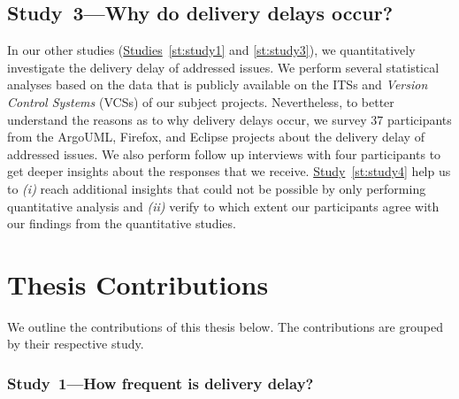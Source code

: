\subsection{Study~3---Why do delivery delays occur?}

 In our other studies
(\hyperref[st:study1]{Studies}~\ref{st:study1} and \ref{st:study3}), we
quantitatively investigate the delivery delay of addressed issues. We perform
several statistical analyses based on the data that is publicly available on the
ITSs and {\em Version Control Systems} (VCSs) of our subject projects. Nevertheless, to better understand the
reasons as to why delivery delays occur, we survey 37 participants from the
ArgoUML, Firefox, and Eclipse projects about the delivery delay of addressed
issues. We also perform follow up interviews with four participants to get
deeper insights about the responses that we receive.
\hyperref[st:study4]{Study}~\ref{st:study4} help us to {\em (i)} reach
additional insights that could not be possible by only performing quantitative
analysis and {\em (ii)} verify to which extent our participants agree with our
findings from the quantitative studies. 

\section{Thesis Contributions}

We outline the contributions of this thesis below. The contributions are grouped
by their respective study.

\subsubsection*{Study~1---How frequent is delivery delay?}

